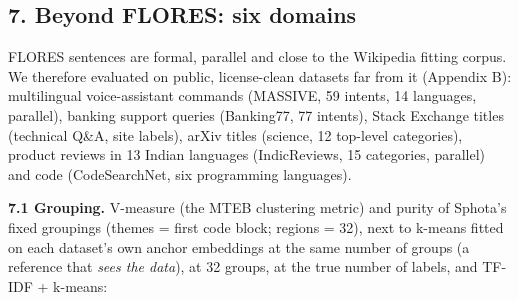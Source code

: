\documentclass[
  10pt,
]{article}
\begin{document}
\hypertarget{beyond-flores-six-domains}{%
\subsection{7. Beyond FLORES: six
domains}\label{beyond-flores-six-domains}}

FLORES sentences are formal, parallel and close to the Wikipedia fitting
corpus. We therefore evaluated on public, license-clean datasets far
from it (Appendix B): multilingual voice-assistant commands (MASSIVE, 59
intents, 14 languages, parallel), banking support queries (Banking77, 77
intents), Stack Exchange titles (technical Q\&A, site labels), arXiv
titles (science, 12 top-level categories), product reviews in 13 Indian
languages (IndicReviews, 15 categories, parallel) and code
(CodeSearchNet, six programming languages).

\textbf{7.1 Grouping.} V-measure (the MTEB clustering metric) and purity
of Sphota's fixed groupings (themes = first code block; regions = 32),
next to k-means fitted on each dataset's own anchor embeddings at the
same number of groups (a reference that \emph{sees the data}), at 32
groups, at the true number of labels, and TF-IDF + k-means:
\end{document}

